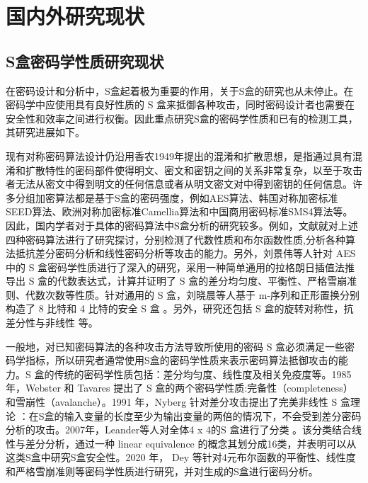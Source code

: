 \documentclass{xduugthesis}
\begin{document}
\section{国内外研究现状}
\subsection{S盒密码学性质研究现状}
在密码设计和分析中，S盒起着极为重要的作用，关于S盒的研究也从未停止。在密码学中应使用具有良好性质的 S 盒来抵御各种攻击，同时密码设计者也需要在安全性和效率之间进行权衡。因此重点研究S盒的密码学性质和已有的检测工具，其研究进展如下。\par

现有对称密码算法设计仍沿用香农1949年提出的混淆和扩散思想\cite{DBLP:journals/bstj/Shannon49a}，是指通过具有混淆和扩散特性的密码部件使得明文、密文和密钥之间的关系非常复杂，以至于攻击者无法从密文中得到明文的任何信息或者从明文密文对中得到密钥的任何信息。许多分组加密算法都是基于S盒的密码强度，例如AES算法、韩国对称加密标准SEED算法、欧洲对称加密标准Camellia算法和中国商用密码标准SMS4算法等。因此，国内学者对于具体的密码算法中S盒分析的研究较多。例如，文献\cite{刘佳2013对称密码算法}就对上述四种密码算法进行了研究探讨，分别检测了代数性质和布尔函数性质,分析各种算法抵抗差分密码分析和线性密码分析等攻击的能力。另外，刘景伟等人针对 AES 中的 S 盒密码学性质进行了深入的研究，采用一种简单通用的拉格朗日插值法推导出 S 盒的代数表达式，计算并证明了 S 盒的差分均匀度、平衡性、严格雪崩准则、代数次数等性质\cite{刘景伟2004aes}。针对通用的 S 盒，刘晓晨等人基于 m-序列和正形置换分别构造了 8 比特和 4 比特的安全 S 盒 \cite{刘晓晨2000满足若干密码学性质的}。另外，研究还包括 S 盒的旋转对称性\cite{高光普2017旋转对称布尔函数研究综述}，抗差分性与非线性 \cite{吴丹2011s}等。\par
一般地，对已知密码算法的各种攻击方法导致所使用的密码 S 盒必须满足一些密码学指标，所以研究者通常使用S盒的密码学性质来表示密码算法抵御攻击的能力。S 盒的传统的密码学性质包括：差分均匀度、线性度及相关免疫度等。1985年，Webster 和 Tavares 提出了 S 盒的两个密码学性质\cite{webster1985design}:完备性（completeness）和雪崩性（avalanche）。1991 年，Nyberg 针对差分攻击提出了完美非线性 S 盒理论 \cite{nyberg1991perfect}：在S盒的输入变量的长度至少为输出变量的两倍的情况下，不会受到差分密码分析的攻击。2007年，Leander等人对全体4 x 4的S 盒进行了分类 \cite{leander2007classification}。该分类结合线性与差分分析，通过一种 linear equivalence 的概念其划分成16类，并表明可以从这类S盒中研究S盒安全性。2020 年， Dey 等针对4元布尔函数的平衡性、线性度和严格雪崩准则等密码学性质进行研究，并对生成的S盒进行密码分析\cite{dey20204}。\par
\end{document}
